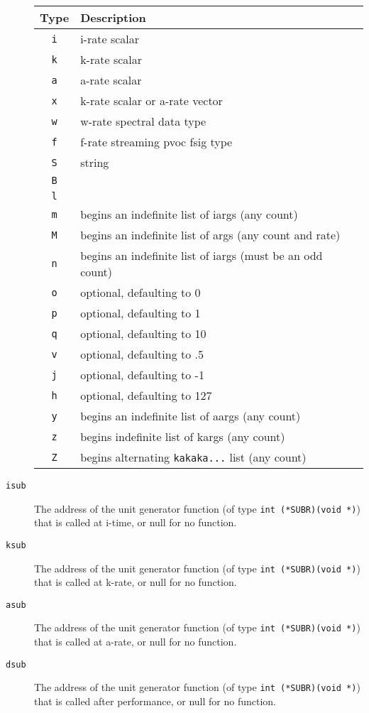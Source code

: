 \documentclass[10pt,letterpaper,onecolumn]{book}
\begin{document}
\begin{description}
			\begin{center}
			\begin{tabular*}{280pt}[t]{cl}
			Type & Description \\
			\hline
			\texttt{i} & i-rate scalar \\
			\texttt{k} & k-rate scalar \\
			\texttt{a} & a-rate scalar \\
			\texttt{x} & k-rate scalar or a-rate vector \\
			\texttt{w} & w-rate spectral data type \\
			\texttt{f} & f-rate streaming pvoc fsig type \\
			\texttt{S} & string \\
			\texttt{B} & \\
			\texttt{l} & \\
			\texttt{m} & begins an indefinite list of iargs (any count) \\
			\texttt{M} & begins an indefinite list of args (any count and rate) \\
			\texttt{n} & begins an indefinite list of iargs (must be an odd count) \\
			\texttt{o} & optional, defaulting to 0 \\
			\texttt{p} & optional, defaulting to 1 \\
			\texttt{q} & optional, defaulting to 10 \\
			\texttt{v} & optional, defaulting to .5 \\ 
			\texttt{j} & optional, defaulting to -1 \\
			\texttt{h} & optional, defaulting to 127 \\
			\texttt{y} & begins an indefinite list of aargs (any count) \\ 
			\texttt{z} & begins indefinite list of kargs (any count) \\
			\texttt{Z} & begins alternating \texttt{kakaka...} list (any count) \\
			\end{tabular*}
			\end{center}

	\item[\texttt{isub}] The address of the unit generator function (of type \texttt{int (*SUBR)(void *)}) that is called at i-time, or null for no function.
	\item[\texttt{ksub}] The address of the unit generator function (of type \texttt{int (*SUBR)(void *)}) that is called at k-rate, or null for no function.
	\item[\texttt{asub}] The address of the unit generator function (of type \texttt{int (*SUBR)(void *)}) that is called at a-rate, or null for no function.
	\item[\texttt{dsub}] The address of the unit generator function (of type \texttt{int (*SUBR)(void *)}) that is called after performance, or null for no function.

\end{description}
\end{document}
